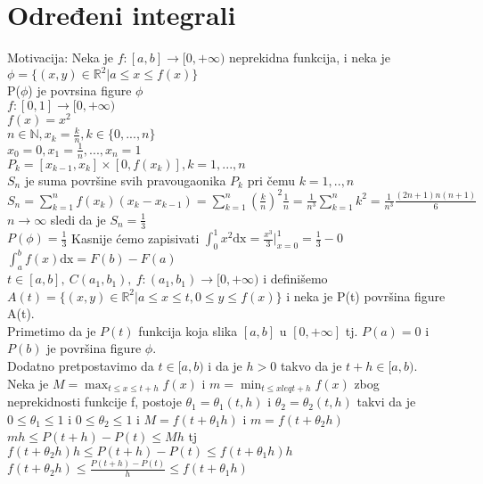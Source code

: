 \documentclass{article}
\begin{document}
\section{Određeni integrali}
Motivacija: Neka je $f: [a,b] \rightarrow [0, +\infty)$ neprekidna funkcija, i neka je $\phi = \{ (x, y) \in \mathbb{R}^2 | a \leq x \leq f(x)\}$\\
P($\phi$) je povrsina figure $\phi$\\
$f: [0, 1] \rightarrow [0, +\infty)$\\
$f(x) = x^2$\\
$n \in \mathbb{N}, x_k = \frac{k}{n}, k \in \{0, ..., n\}$\\
$x_0 = 0, x_1 = \frac{1}{n}, ..., x_n = 1$\\
$P_k = [x_{k-1}, x_k]\times [0, f(x_k)], k=1,...,n$\\
$S_n$ je suma površine svih pravougaonika $P_k$ pri čemu $k = 1,.., n$\\
$\displaystyle S_n = \sum_{k=1}^{n} f(x_k)(x_k - x_{k-1}) = \sum_{k=1}^{n} (\frac{k}{n})^2\frac{1}{n} = \frac{1}{n^3}\sum_{k=1}^n k^2 = \frac{1}{n^3}\frac{(2n+1)n(n+1)}{6}$\\
$n\rightarrow\infty$ sledi da je $S_n = \frac{1}{3}$\\
$P(\phi) = \frac{1}{3}$ Kasnije ćemo zapisivati $\displaystyle \int_0^1 x^2\text{dx} = \frac{x^3}{3} \Bigg|^1_{x=0} = \frac{1}{3} - 0$\\
$\displaystyle \int^b_a f(x)\text{dx} = F(b) - F(a)$\\
$t \in [a, b],\ C(a_1, b_1),\ f: (a_1, b_1) \rightarrow [0, +\infty)$ i definišemo $A(t) = \{(x, y) \in \mathbb{R}^2 | a\leq x \leq t, 0\leq y \leq f(x)\}$ i neka je P(t) površina figure A(t).\\
Primetimo da je $P(t)$ funkcija koja slika $[a, b]$ u $[0, +\infty]$ tj. $P(a) = 0$ i $P(b)$ je površina figure $\phi$.\\
Dodatno pretpostavimo da $t \in [a, b)$ i da je $h > 0$ takvo da je $t + h \in [a, b)$.\\
Neka je $\displaystyle M = \max_{t\leq x\leq t+ h} f(x)$ i $m = \min_{t \leq x leq t+h} f(x)$ zbog neprekidnosti funkcije f, postoje $\theta_1 = \theta_1(t, h)$ i $\theta_2 = \theta_2(t, h)$ takvi da je $0\leq \theta_1 \leq 1$ i $0\leq \theta_2 \leq 1$ i $M = f(t + \theta_1h)$ i $m = f(t + \theta_2h)$\\
$m h \leq P(t + h) - P(t) \leq M h$ tj $f(t + \theta_2h)h \leq P(t+h) - P(t) \leq f(t + \theta_1h)h$\\
$f(t+\theta_2h) \leq \frac{P(t + h) - P(t)}{h}\leq f(t+\theta_1h)$\\
\end{document}

